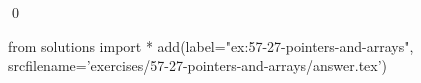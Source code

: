
\begin{ex}
  \label{ex:57-27-pointers-and-arrays}
  
  \qed
\end{ex}
\begin{python0}
from solutions import *
add(label="ex:57-27-pointers-and-arrays",
    srcfilename='exercises/57-27-pointers-and-arrays/answer.tex')
\end{python0}
